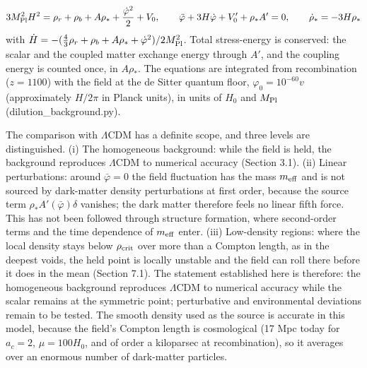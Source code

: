 \documentclass[11pt,a4paper]{article}
\begin{document}
\begin{equation}
3M_{\rm Pl}^2H^2=\rho_r+\rho_b+A\rho_*+\frac{\dot\varphi^2}{2}+V_0,\qquad \ddot\varphi+3H\dot\varphi+V_0'+\rho_*A'=0,\qquad \dot\rho_*=-3H\rho_*
\end{equation}
with $\dot H=-(\tfrac43\rho_r+\rho_b+A\rho_*+\dot\varphi^2)/2M_{\rm Pl}^2$. Total stress-energy is conserved: the scalar and the coupled matter exchange energy through $A'$, and the coupling energy is counted once, in $A\rho_*$. The equations are integrated from recombination ($z=1100$) with the field at the de Sitter quantum floor, $\varphi_0=10^{-60}v$ (approximately $H/2\pi$ in Planck units), in units of $H_0$ and $M_{\rm Pl}$ (dilution\_background.py).

The comparison with $\Lambda$CDM has a definite scope, and three levels are distinguished. (i) The homogeneous background: while the field is held, the background reproduces $\Lambda$CDM to numerical accuracy (Section 3.1). (ii) Linear perturbations: around $\bar\varphi=0$ the field fluctuation has the mass $m_{\rm eff}$ and is not sourced by dark-matter density perturbations at first order, because the source term $\rho_*A'(\bar\varphi)\delta$ vanishes; the dark matter therefore feels no linear fifth force. This has not been followed through structure formation, where second-order terms and the time dependence of $m_{\rm eff}$ enter. (iii) Low-density regions: where the local density stays below $\rho_{\rm crit}$ over more than a Compton length, as in the deepest voids, the held point is locally unstable and the field can roll there before it does in the mean (Section 7.1). The statement established here is therefore: the homogeneous background reproduces $\Lambda$CDM to numerical accuracy while the scalar remains at the symmetric point; perturbative and environmental deviations remain to be tested. The smooth density used as the source is accurate in this model, because the field's Compton length is cosmological (17 Mpc today for $a_c=2$, $\mu=100H_0$, and of order a kiloparsec at recombination), so it averages over an enormous number of dark-matter particles.
\end{document}
